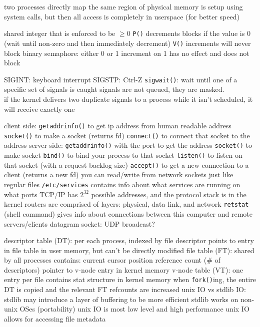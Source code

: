 \documentclass[12pt]{article}
\begin{document}
\begin{spacing}{0.8}
\begin{multicols*}{2}
\begin{flushleft}
\begin{outline}[longenum]

  \1 two processes directly map the same region of physical memory
  \1 is setup using system calls, but then all access is completely in userspace (for better speed)

  \1 shared integer that is enforced to be $\geq0$
  \1 \verb|P()| decrements
    \2 blocks if the value is 0 (wait until non-zero and then immediately decrement)
  \1 \verb|V()| increments
    \2 will never block
  \1 binary semaphore: either 0 or 1
    \2 increment on 1 has no effect and does not block

  \1 SIGINT: keyboard interrupt
  \1 SIGSTP: Ctrl-Z
  \1 \verb|sigwait()|: wait until one of a specific set of signals is caught
  \1 signals are not queued, they are masked.
    \\ if the kernel delivers two duplicate signals to a process while it isn't scheduled, it will receive exactly one

  \1 client side:
    \2 \verb|getaddrinfo()| to get ip address from human readable address
    \2 \verb|socket()| to make a socket (returns fd)
    \2 \verb|connect()| to connect that socket to the address
  \1 server side:
    \2 \verb|getaddrinfo()| with the port to get the address
    \2 \verb|socket()| to make socket 
    \2 \verb|bind()| to bind your process to that socket
    \2 \verb|listen()| to listen on that socket (with a request backlog size)
    \2 \verb|accept()| to get a new connection to a client (returns a new fd)
  \1 you can read/write from network sockets just like regular files
  \1 \verb|/etc/services| contains info about what services are running on what ports 
  \1 TCP/IP has $2^32$ possible addresses, and the protocol stack is in the kernel
  \1 routers are comprised of layers: physical, data link, and network
  \1 \verb|retstat| (shell command) gives info about connections between this computer and remote servers/clients
  \1 datagram socket: UDP broadcast?


  \1 descriptor table (DT):
    \2 per each process, indexed by file descriptor
    \2 points to entry in file table
    \2 in user memory, but can't be directly modified
  \1 file table (FT):
    \2 shared by all processes
    \2 contains:
      \3 current cursor position
      \3 reference count (\# of descriptors)
      \3 pointer to v-node entry
    \2 in kernel memory
  \1 v-node table (VT):
    \2 one entry per file
    \2 contains stat structure
    \2 in kernel memory
  \1 when \verb|fork()|ing, the entire DT is copied and the relevant FT refcounts are increased
  \1 unix IO vs stdlib IO:
    \2 stdlib may introduce a layer of buffering to be more efficient
    \2 stdlib works on non-unix OSes (portability)
    \2 unix IO is most low level and high performance
    \2 unix IO allows for accessing file metadata



\end{outline}
\end{flushleft}
\end{multicols*}
\end{spacing}
\end{document}
